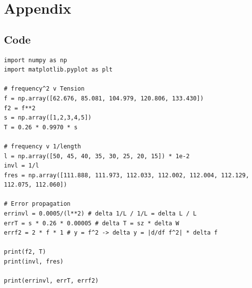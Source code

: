 \documentclass[12pt]{article}
\begin{document}
\newpage



 \label{sec:ref}

\vspace{1.5cm}

\listoffigures

\listoftables

\section*{Appendix} \label{sec:A}

\subsection*{Code}

%

\begin{minipage}{\linewidth}
\captionsetup{hypcap=false}

\begin{mintedbox}
\begin{verbatim}
import numpy as np
import matplotlib.pyplot as plt

# frequency^2 v Tension
f = np.array([62.676, 85.081, 104.979, 120.806, 133.430])
f2 = f**2
s = np.array([1,2,3,4,5])
T = 0.26 * 0.9970 * s

# frequency v 1/length
l = np.array([50, 45, 40, 35, 30, 25, 20, 15]) * 1e-2
invl = 1/l
fres = np.array([111.888, 111.973, 112.033, 112.002, 112.004, 112.129, 112.075, 112.060])

# Error propagation
errinvl = 0.0005/(l**2) # delta 1/L / 1/L = delta L / L
errT = s * 0.26 * 0.00005 # delta T = sz * delta W
errf2 = 2 * f * 1 # y = f^2 -> delta y = |d/df f^2| * delta f

print(f2, T)
print(invl, fres)

print(errinvl, errT, errf2)

\end{verbatim}
\end{mintedbox}
\end{minipage}
\end{document}
